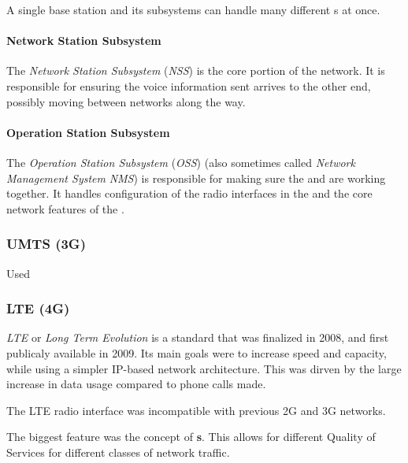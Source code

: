 A single base station and its subsystems can handle many different s at once.

\paragraph{Network Station Subsystem}\label{par:Network_Station_Subsystem}
\begin{definition}\label{def:Network_Station_Subsystem}
  The \emph{Network Station Subsystem} (\emph{NSS}) is the core portion of the network.
  It is responsible for ensuring the voice information sent arrives to the other end, possibly moving between networks along the way.
\end{definition}

\paragraph{Operation Station Subsystem}\label{par:Operation_Station_Subsystem}
\begin{definition}\label{def:Operation_Station_Subsystem}
  The \emph{Operation Station Subsystem} (\emph{OSS}) (also sometimes called \emph{Network Management System} \emph{NMS}) is responsible for making sure the  and  are working together.
  It handles configuration of the radio interfaces in the  and the core network features of the .
\end{definition}

\subsubsection{UMTS (3G)}\label{subsubsec:3G}
Used 

\subsubsection{LTE (4G)}\label{subsubsec:4G}
\begin{definition}[LTE]\label{def:LTE}
  \emph{LTE} or \emph{Long Term Evolution} is a standard that was finalized in 2008, and first publicaly available in 2009.
  Its main goals were to increase speed and capacity, while using a simpler IP-based network architecture.
  This was dirven by the large increase in data usage compared to phone calls made.

  The LTE radio interface was incompatible with previous 2G and 3G networks.

  The biggest feature was the concept of \textbf{s}.
  This allows for different Quality of Services for different classes of network traffic.
\end{definition}

